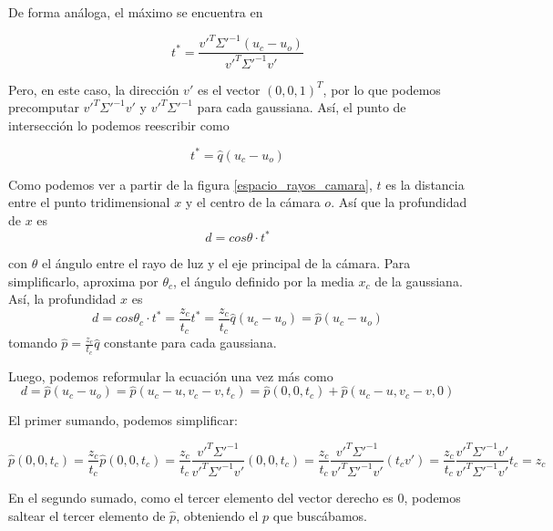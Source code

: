 De forma análoga, el máximo se encuentra en

\begin{equation}
t^* = \frac{v'^T \Sigma'^{-1} (u_c - u_o)}{v'^T \Sigma'^{-1} v'}
\end{equation}

Pero, en este caso, la dirección $v'$ es el vector $(0,0,1)^T$, por lo que podemos precomputar $v'^T \Sigma'^{-1} v'$ y $v'^T \Sigma'^{-1}$ para cada gaussiana. Así, el punto de intersección lo podemos reescribir como

\begin{equation}
t^* = \hat{q}(u_c-u_o)
\end{equation}

Como podemos ver a partir de la figura \ref{espacio_rayos_camara}, $t$ es la distancia entre el punto tridimensional $x$ y el centro de la cámara $o$. Así que la profundidad de $x$ es
\begin{equation}
d = cos\theta \cdot t^*
\end{equation}

\noindent con $\theta$ el ángulo entre el rayo de luz y el eje principal de la cámara. Para simplificarlo, \cite{zhang2024radegs} aproxima por $\theta_c$, el ángulo definido por la media $x_c$ de la gaussiana. Así, la profundidad $x$ es
\begin{equation}
d = cos\theta_c \cdot t^* = \frac{z_c}{t_c} t^* = \frac{z_c}{t_c} \hat{q} (u_c - u_o)
= \hat{p}(u_c - u_o)
\end{equation}
tomando $\hat{p} = \frac{z_c}{t_c} \hat{q}$ constante para cada gaussiana.

Luego, podemos reformular la ecuación una vez más como
\begin{equation}
d = \hat{p}(u_c - u_o) = \hat{p}(u_c-u,v_c-v,t_c) = \hat{p}(0,0,t_c) + \hat{p}(u_c-u, v_c-v,0)
\end{equation}

El primer sumando, podemos simplificar:

\begin{equation}
\hat{p}(0,0,t_c) = \frac{z_c}{t_c}\hat{p}(0,0,t_c) = \frac{z_c}{t_c} \frac{v'^T \Sigma'^{-1}}{v'^T \Sigma'^{-1}v'} (0,0,t_c) = \frac{z_c}{t_c} \frac{v'^T \Sigma'^{-1}}{v'^T \Sigma'^{-1}v'} (t_c v')
= \frac{z_c}{t_c} \frac{v'^T \Sigma'^{-1} v'}{v'^T \Sigma'^{-1}v'} t_c = z_c
\end{equation}

En el segundo sumado, como el tercer elemento del vector derecho es 0, podemos saltear el tercer elemento de $\hat{p}$, obteniendo el $p$ que buscábamos.

